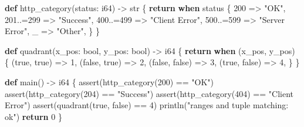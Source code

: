 \documentclass[
  english,
  oneside]{book}
\newenvironment{Shaded}{\begin{snugshade}}{\end{snugshade}}
\newcommand{\ConstantTok}[1]{\textcolor[rgb]{0.31,0.76,1.00}{#1}}
\newcommand{\ControlFlowTok}[1]{\textcolor[rgb]{0.77,0.53,0.75}{\textbf{#1}}}
\newcommand{\DataTypeTok}[1]{\textcolor[rgb]{0.31,0.79,0.69}{#1}}
\newcommand{\DecValTok}[1]{\textcolor[rgb]{0.71,0.81,0.66}{#1}}
\newcommand{\FunctionTok}[1]{\textcolor[rgb]{0.86,0.86,0.67}{#1}}
\newcommand{\KeywordTok}[1]{\textcolor[rgb]{0.34,0.61,0.84}{\textbf{#1}}}
\newcommand{\NormalTok}[1]{\textcolor[rgb]{0.83,0.83,0.83}{#1}}
\newcommand{\OperatorTok}[1]{\textcolor[rgb]{0.83,0.83,0.83}{#1}}
\newcommand{\StringTok}[1]{\textcolor[rgb]{0.81,0.57,0.47}{#1}}
\begin{document}
\begin{Shaded}
\begin{Highlighting}[]
\KeywordTok{def}\NormalTok{ http\_category(status: }\DataTypeTok{i64}\NormalTok{) }\OperatorTok{{-}\textgreater{}} \DataTypeTok{str}\NormalTok{ \{}
    \ControlFlowTok{return} \ControlFlowTok{when}\NormalTok{ status \{}
        \DecValTok{200} \OperatorTok{=\textgreater{}} \StringTok{"OK"}\NormalTok{,}
        \DecValTok{201}\OperatorTok{..=}\DecValTok{299} \OperatorTok{=\textgreater{}} \StringTok{"Success"}\NormalTok{,}
        \DecValTok{400}\OperatorTok{..=}\DecValTok{499} \OperatorTok{=\textgreater{}} \StringTok{"Client Error"}\NormalTok{,}
        \DecValTok{500}\OperatorTok{..=}\DecValTok{599} \OperatorTok{=\textgreater{}} \StringTok{"Server Error"}\NormalTok{,}
\NormalTok{        \_ }\OperatorTok{=\textgreater{}} \StringTok{"Other"}\NormalTok{,}
\NormalTok{    \}}
\NormalTok{\}}

\KeywordTok{def}\NormalTok{ quadrant(x\_pos: }\DataTypeTok{bool}\NormalTok{, y\_pos: }\DataTypeTok{bool}\NormalTok{) }\OperatorTok{{-}\textgreater{}} \DataTypeTok{i64}\NormalTok{ \{}
    \ControlFlowTok{return} \ControlFlowTok{when}\NormalTok{ (x\_pos, y\_pos) \{}
\NormalTok{        (}\ConstantTok{true}\NormalTok{, }\ConstantTok{true}\NormalTok{) }\OperatorTok{=\textgreater{}} \DecValTok{1}\NormalTok{,}
\NormalTok{        (}\ConstantTok{false}\NormalTok{, }\ConstantTok{true}\NormalTok{) }\OperatorTok{=\textgreater{}} \DecValTok{2}\NormalTok{,}
\NormalTok{        (}\ConstantTok{false}\NormalTok{, }\ConstantTok{false}\NormalTok{) }\OperatorTok{=\textgreater{}} \DecValTok{3}\NormalTok{,}
\NormalTok{        (}\ConstantTok{true}\NormalTok{, }\ConstantTok{false}\NormalTok{) }\OperatorTok{=\textgreater{}} \DecValTok{4}\NormalTok{,}
\NormalTok{    \}}
\NormalTok{\}}

\KeywordTok{def}\NormalTok{ main() }\OperatorTok{{-}\textgreater{}} \DataTypeTok{i64}\NormalTok{ \{}
    \FunctionTok{assert}\NormalTok{(http\_category(}\DecValTok{200}\NormalTok{) }\OperatorTok{==} \StringTok{"OK"}\NormalTok{)}
    \FunctionTok{assert}\NormalTok{(http\_category(}\DecValTok{204}\NormalTok{) }\OperatorTok{==} \StringTok{"Success"}\NormalTok{)}
    \FunctionTok{assert}\NormalTok{(http\_category(}\DecValTok{404}\NormalTok{) }\OperatorTok{==} \StringTok{"Client Error"}\NormalTok{)}
    \FunctionTok{assert}\NormalTok{(quadrant(}\ConstantTok{true}\NormalTok{, }\ConstantTok{false}\NormalTok{) }\OperatorTok{==} \DecValTok{4}\NormalTok{)}
\NormalTok{    println(}\StringTok{"ranges and tuple matching: ok"}\NormalTok{)}
    \ControlFlowTok{return} \DecValTok{0}
\NormalTok{\}}
\end{Highlighting}
\end{Shaded}
\end{document}

